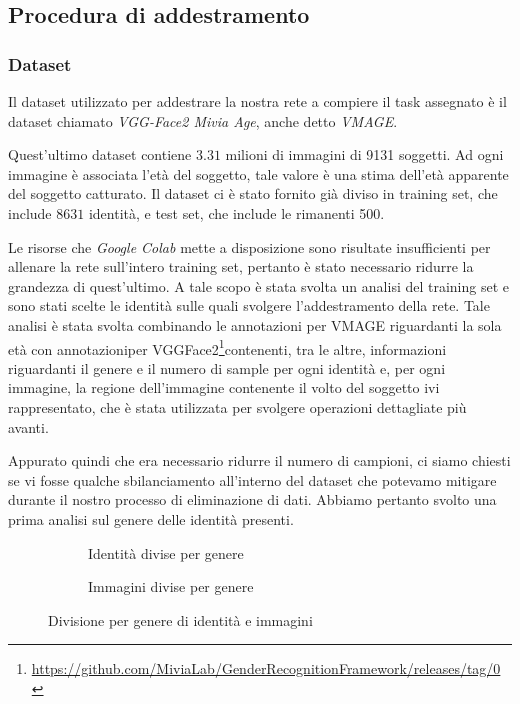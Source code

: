 \subsection{Procedura di addestramento}
\subsubsection{Dataset}
\label{subsubsec:dataset}

Il dataset utilizzato per addestrare la nostra rete a compiere il task assegnato è il dataset chiamato \emph{VGG-Face2 Mivia Age}, anche detto \emph{VMAGE}\cite{miviaage}.

Quest'ultimo dataset contiene $3.31$ milioni di immagini di 9131 soggetti. Ad ogni immagine è associata l'età del soggetto, tale valore è una stima dell'età apparente del soggetto catturato.
Il dataset ci è stato fornito già diviso in training set, che include $8631$ identità, e test set, che include le rimanenti 500.

Le risorse che \textit{Google Colab} mette a disposizione sono risultate insufficienti per allenare la rete sull'intero training set, pertanto è stato necessario ridurre la grandezza di quest'ultimo. A tale scopo è stata svolta un analisi del training set e sono stati scelte le identità sulle quali svolgere l'addestramento della rete. Tale analisi è stata svolta combinando le annotazioni per VMAGE riguardanti la sola età con annotazioniper VGGFace2\footnote{\url{https://github.com/MiviaLab/GenderRecognitionFramework/releases/tag/0}}contenenti, tra le altre, informazioni riguardanti il genere e il numero di sample per ogni identità e, per ogni immagine, la regione dell'immagine contenente il volto del soggetto ivi rappresentato, che è stata utilizzata per svolgere operazioni dettagliate più avanti.

Appurato quindi che era necessario ridurre il numero di campioni, ci siamo chiesti se vi fosse qualche sbilanciamento all'interno del dataset che potevamo mitigare durante il nostro processo di eliminazione di dati. Abbiamo pertanto svolto una prima analisi sul genere delle identità presenti.

\begin{figure}[ht]

\begin{subfigure}{0.5\textwidth}
\def\svgscale{0.5}

\caption{Identità divise per genere}
\label{sfig:Ids per gender}
\end{subfigure}
\begin{subfigure}{0.5\textwidth}
\def\svgscale{0.5}

\caption{Immagini divise per genere}
\label{sfig:Images per gender}
\end{subfigure}
\caption{Divisione per genere di identità e immagini}
\label{fig:gender_division}
\end{figure}

